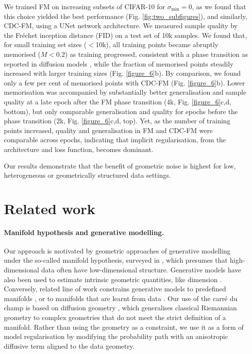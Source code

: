 \documentclass{article} %
\begin{document}
We trained FM on increasing subsets of CIFAR-10 for $\sigma_{\min}\!=\!0$, as we found that this choice yielded the best performance (Fig. \ref{fig:two_subfigures}), and similarly, CDC-FM, using a UNet network architecture. 
We measured sample quality by the Fr\'{e}chet inception distance (FID) on a test set of 10k samples.
We found that, for small training set sizes ($<$10k), all training points became abruptly memorised ($M\!<\!0.2$) as training progressed, consistent with a phase transition as reported in diffusion models \citep{pham2024memorization}, while the fraction of memorised points steadily increased with larger training sizes (Fig. \ref{figure_6}b). 
By comparison, we found only a few per cent of memorised points with CDC-FM (Fig. \ref{figure_6}b).
Lower memorisation was accompanied by substantially better generalisation and sample quality at a late epoch after the FM phase transition (4k, Fig. \ref{figure_6}c,d, bottom), but only comparable generalisation and quality for epochs before the phase transition (2k, Fig. \ref{figure_6}c,d, top). 
Yet, as the number of training points increased, quality and generalisation in FM and CDC-FM were comparable across epochs, indicating that implicit regularisation, from the architecture and loss function, becomes dominant. 

Our results demonstrate that the benefit of geometric noise is highest for low, heterogeneous or geometrically structured data settings.

\section{Related work}

\paragraph{Manifold hypothesis and generative modelling.} 
Our approach is motivated by geometric approaches of generative modelling under the so-called manifold hypothesis, surveyed in \cite{loaiza-ganem_deep_2024}, which presumes that high-dimensional data often have low-dimensional structure.
Generative models have also been used to estimate intrinsic geometric quantities, like dimension \citep{stanczuk_your_2023}.
Conversely, related line of work constrains generative models to predefined manifolds \citep{chen_flow_2024, huang_riemannian_2022, mathieu_riemannian_2020, bortoli_convergence_2023}, or to manifolds that are learnt from data \citep{kapusniak2024metric, peach_implicit_2024, gosztolai2025}.
Our use of the carré du champ is based on diffusion geometry \citep{jones2024diffusion}, which generalises classical Riemannian geometry to complex geometries that do not meet the strict definition of a manifold.
Rather than using the geometry as a constraint, we use it as a form of model regularisation by modifying the probability path with an anisotropic diffusive term aligned to the data geometry.
\end{document}
